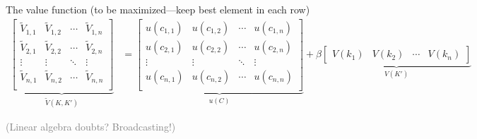 \documentclass[10pt, aspectratio=1610, handout]{beamer}
\begin{document}
\begin{frame}
    The value function (to be maximized---keep best element in each row)
    \begin{align*}
      \underbrace{\begin{bmatrix}
        \tilde{V}_{1,1} & \tilde{V}_{1,2} & \cdots & \tilde{V}_{1,n} \\
        \tilde{V}_{2,1} & \tilde{V}_{2,2} & \cdots & \tilde{V}_{2,n} \\
        \vdots   & \vdots   & \ddots & \vdots   \\
        \tilde{V}_{n,1} & \tilde{V}_{n,2} & \cdots & \tilde{V}_{n,n} \\
      \end{bmatrix}}_{\tilde{V}(K, K')}
      &=
      \underbrace{\begin{bmatrix}
        u(c_{1,1}) & u(c_{1,2}) & \cdots & u(c_{1,n}) \\
        u(c_{2,1}) & u(c_{2,2}) & \cdots & u(c_{2,n}) \\
        \vdots  & \vdots  & \ddots & \vdots  \\
        u(c_{n,1}) & u(c_{n,2}) & \cdots & u(c_{n,n}) \\
      \end{bmatrix}}_{u(C)}
      + \beta
      \underbrace{\begin{bmatrix}
        V(k_1) & V(k_2) & \cdots & V(k_n)
      \end{bmatrix}}_{V(K')}
    \end{align*}

    \vfill

    \vfill

    \textcolor{gray}{(Linear algebra doubts? Broadcasting!)}
    \hfill

  \end{frame}
\end{document}

